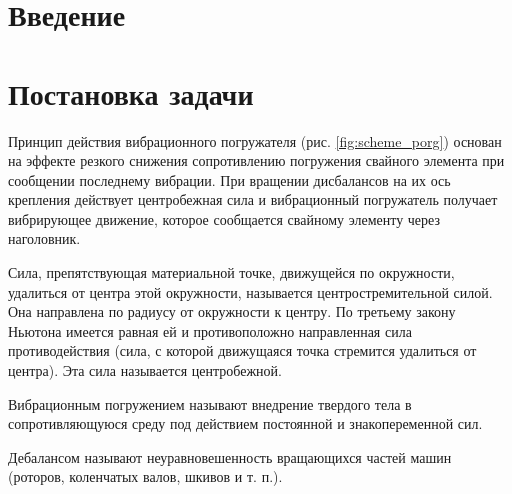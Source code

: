 \section*{Введение}


\clearpage
\section{Постановка задачи}

Принцип действия вибрационного погружателя (рис. \ref{fig:scheme_porg}) основан на эффекте резкого снижения сопротивлению погружения свайного элемента при сообщении последнему вибрации. При вращении дисбалансов на их ось крепления действует центробежная сила и вибрационный погружатель получает вибрирующее движение, которое сообщается свайному элементу через наголовник.

\begin{definition}
    Сила, препятствующая материальной точке, движущейся по окружности, удалиться от центра этой окружности, называется центростремительной силой. Она направлена по радиусу от окружности к центру. По третьему закону Ньютона имеется равная ей и противоположно направленная сила противодействия (сила, с которой движущаяся точка стремится удалиться от центра). Эта сила называется центробежной.
\end{definition}

\begin{definition}
    Вибрационным погружением называют внедрение твердого тела в сопротивляющуюся среду под действием постоянной и знакопеременной сил.
\end{definition}


\begin{definition}
    Дебалансом называют неуравновешенность вращающихся частей машин (роторов, коленчатых валов, шкивов и т. п.).
\end{definition}

